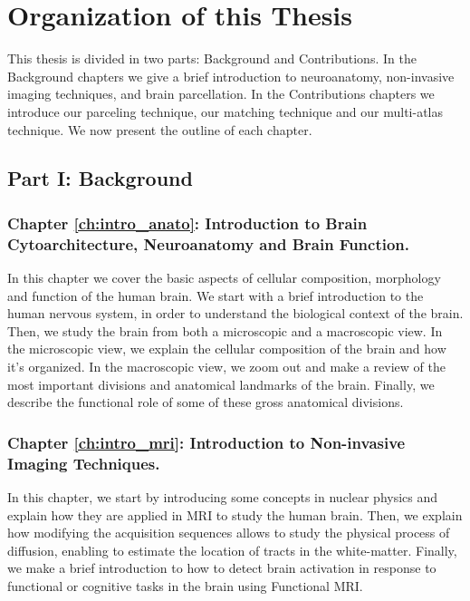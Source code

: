 \section*{Organization of this Thesis}

This thesis is divided in two parts: Background and Contributions. In the
Background chapters we give a brief introduction to neuroanatomy, non-invasive
imaging techniques, and brain parcellation. In the Contributions chapters we
introduce our parceling technique, our matching technique and our multi-atlas
technique. We now present the outline of each chapter.

\subsection{Part I: Background}

\subsubsection{Chapter \ref{ch:intro_anato}: Introduction to Brain Cytoarchitecture, Neuroanatomy and Brain Function.}
In this chapter we cover the basic aspects of cellular composition, morphology
and function of the human brain. We start with a brief introduction to the
human nervous system, in order to understand the biological context of the brain.
Then, we study the brain from both a microscopic and a macroscopic view. In the
microscopic view, we explain the cellular composition of the brain and how it’s
organized. In the macroscopic view, we zoom out and make a review of the most 
important divisions and anatomical landmarks of the brain. Finally, we describe
the functional role of some of these gross anatomical divisions.

\subsubsection{Chapter \ref{ch:intro_mri}: Introduction to Non-invasive Imaging Techniques.}
In this chapter, we start by introducing some concepts in
nuclear physics and explain how they are applied in MRI to study the human
brain. Then, we explain how modifying the acquisition sequences allows to
study the physical process of diffusion, enabling to estimate the location
of tracts in the white-matter. Finally, we make a brief introduction to how to
detect brain activation in response to functional or cognitive tasks in the
brain using Functional MRI.

